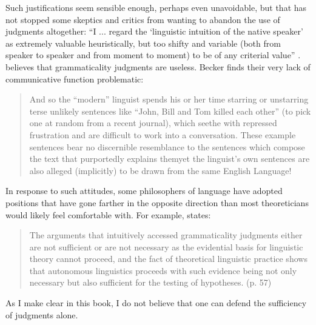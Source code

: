 Such justifications seem sensible enough, perhaps even unavoidable, but that has not stopped some skeptics and critics from wanting to abandon the use of judgments altogether: ``I ... regard the `linguistic intuition of the native speaker' as extremely valuable heuristically, but too shifty and variable (both from speaker to speaker and from moment to moment) to be of any criterial value'' \citep[15]{Householder1965}. \citet{Gethin1990} believes that grammaticality judgments are useless. Becker finds their very lack of communicative function problematic:

\begin{quote}
And so the ``modern'' linguist spends his or her time starring or unstarring terse unlikely sentences like ``John, Bill and Tom killed each other'' (to pick one at random from a recent journal), which seethe with repressed frustration and are difficult to work into a conversation. These example sentences bear no discernible resemblance to the sentences which compose the text that purportedly explains them\schdash{}yet the linguist's own sentences are also alleged (implicitly) to be drawn from the same English Language! \citep[70]{Becker1975}
\end{quote}

In response to such attitudes, some philosophers of language have adopted positions that have gone farther in the opposite direction than most theoreticians would likely feel comfortable with. For example, \citet{Carr1990} states:

\begin{quote}
The arguments that intuitively accessed grammaticality judgments either are not sufficient or are not necessary as the evidential basis for linguistic theory cannot proceed, and the fact of theoretical linguistic practice shows that autonomous linguistics proceeds with such evidence being not only necessary but also sufficient for the testing of hypotheses. (p. 57)

  
 \end{quote}

\noindent
As I make clear in this book, I do not believe that one can defend the sufficiency of judgments alone.

